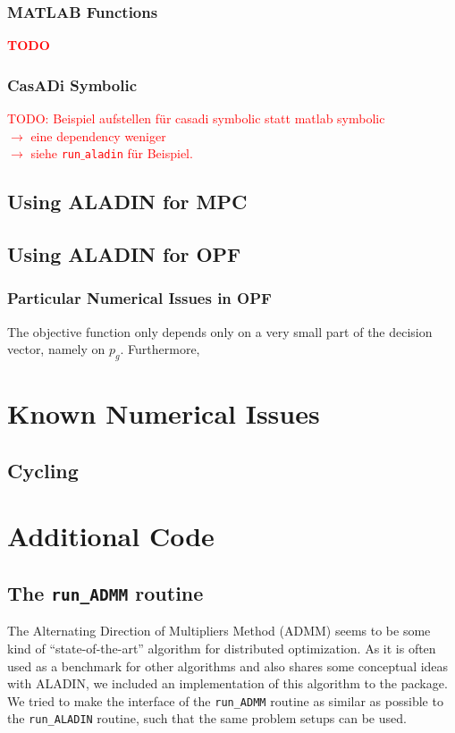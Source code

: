 \documentclass[]{scrartcl}
\begin{document}
\subsubsection{MATLAB Functions}
\textcolor{red}{\textbf{TODO}} 
\subsubsection{CasADi Symbolic}
\textcolor{red}{TODO: Beispiel aufstellen für casadi symbolic statt matlab symbolic \\
$\rightarrow$ eine dependency weniger\\
$\rightarrow$ siehe \texttt{run$\_$aladin} für Beispiel.}
\subsection{Using ALADIN for MPC}
\subsection{Using ALADIN for OPF}
\subsubsection{Particular Numerical Issues in OPF}
The objective function only depends only on a very small part of the decision vector, namely on $p_g$.
Furthermore, 


\section{Known Numerical Issues}
\subsection{Cycling} \label{sec:cycling}


\appendix

\section{Additional Code}
\subsection{The \texttt{run\_ADMM} routine}
The Alternating Direction of Multipliers Method (ADMM) seems to be some kind of ``state-of-the-art'' algorithm for distributed optimization.
As it is often used as a benchmark for other algorithms and also shares some conceptual ideas with ALADIN, we included an implementation of this algorithm to the package.
We tried to make the interface of the \texttt{run\_ADMM} routine as similar as possible to the \texttt{run\_ALADIN} routine, such that the same problem setups can be used. 
\end{document}
